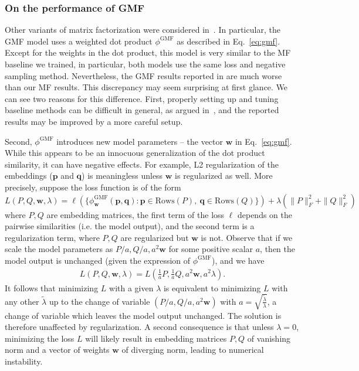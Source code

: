 \documentclass{article}
\newcommand{\bw}{\mathbf{w}}
\newcommand{\Embu}{P}
\newcommand{\Embi}{Q}
\newcommand{\embu}{\mathbf{p}}
\newcommand{\embi}{\mathbf{q}}
\begin{document}
\subsubsection{On the performance of GMF}

Other variants of matrix factorization were considered in~\cite{he:www17}. In particular, the GMF model uses a weighted dot product $\phi^{\text{GMF}}$ as described in Eq.~\eqref{eq:gmf}. Except for the weights in the dot product, this model is very similar to the MF baseline we trained, in particular, both models use the same loss and negative sampling method.
Nevertheless, the GMF results reported in \cite{he:www17} are much worse than our MF results.
This discrepancy may seem surprising at first glance. We can see two reasons for this difference.
First, properly setting up and tuning baseline methods can be difficult in general, as argued in~\cite{rendle:arxiv19}, and the reported results may be improved by a more careful setup.

Second, $\phi^{\text{GMF}}$ introduces new model parameters -- the vector $\bw$ in Eq.~\eqref{eq:gmf}.
While this appears to be an innocuous generalization of the dot product similarity, it can have negative effects.
For example, L2 regularization of the embeddings ($\embu$ and $\embi$) is meaningless unless $\bw$ is regularized as well.
More precisely, suppose the loss function is of the form
\[
L(\Embu, \Embi, \bw, \lambda) = \ell(\{\phi^{\text{GMF}}_\bw(\embu, \embi) : \embu \in \text{Rows}(\Embu), \ \embi \in \text{Rows}(\Embi)\}) + \lambda (\|\Embu\|_F^2 + \|\Embi\|_F^2)
\]
where $\Embu, \Embi$ are embedding matrices, the first term of the loss $\ell$ depends on the pairwise similarities (i.e. the model output), and the second term is a regularization term, where $\Embu, \Embi$ are regularized but $\bw$ is not. Observe that if we scale the model parameters as $\Embu/a, \Embi/a, a^2\bw$ for some positive scalar $a$, then the model output is unchanged (given the expression of $\phi^{\text{GMF}}$), and we have
\begin{align}
    L(P,Q,\bw,\lambda)
    = L\left(\frac{1}{a}P,\frac{1}{a}Q,a^2\bw,a^2\lambda\right).
\end{align}
It follows that minimizing $L$ with a given $\lambda$ is equivalent to minimizing $L$ with any other $\tilde\lambda$ up to the change of variable $(P/a,Q/a,a^2\bw)$ with $a =\sqrt{\frac{\tilde{\lambda}}{\lambda}}$, a change of variable which leaves the model output unchanged. The solution is therefore unaffected by regularization. A second consequence is that unless $\lambda = 0$, minimizing the loss $L$ will likely result in embedding matrices $P, Q$ of vanishing norm and a vector of weights $\bw$ of diverging norm, leading to numerical instability.
\end{document}
